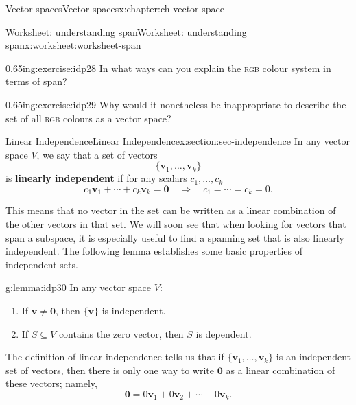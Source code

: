 \documentclass[oneside,10pt,]{book}
\newcommand{\initialism}[1]{\textsc{\MakeLowercase{#1}}}
\newcommand{\terminology}[1]{\textbf{#1}}
\numberwithin{equation}{section}
\newcommand{\vv}{\mathbf{v}}
\begin{document}
\begin{chapterptx}{Vector spaces}{}{Vector spaces}{}{}{x:chapter:ch-vector-space}
\begin{worksheet-section}{Worksheet: understanding span}{}{Worksheet: understanding span}{}{}{x:worksheet:worksheet-span}
\begin{sageinput}
\end{sageinput}
\begin{divisionexercise}{3}{}{0.65in}{g:exercise:idp28}%
In what ways can you explain the \initialism{RGB} colour system in terms of span?%
\end{divisionexercise}%
\begin{divisionexercise}{4}{}{0.65in}{g:exercise:idp29}%
Why would it nonetheless be inappropriate to describe the set of all \initialism{RGB} colours as a vector space?%
\end{divisionexercise}%
\end{worksheet-section}
\restoregeometry
%
%
\typeout{************************************************}
\typeout{************************************************}
%
\begin{sectionptx}{Linear Independence}{}{Linear Independence}{}{}{x:section:sec-independence}
In any vector space \(V\), we say that a set of vectors%
\begin{equation*}
\{\vv_1,\ldots,\vv_k\}
\end{equation*}
is \terminology{linearly independent} if for any scalars \(c_1,\ldots, c_k\)%
\begin{equation*}
c_1\vv_1+\cdots + c_k\vv_k = \mathbf{0} \quad\Rightarrow\quad c_1=\cdots = c_k=0\text{.}
\end{equation*}
%
\par
This means that no vector in the set can be written as a linear combination of the other vectors in that set. We will soon see that when looking for vectors that span a subspace, it is especially useful to find a spanning set that is also linearly independent. The following lemma establishes some basic properties of independent sets.%
\begin{lemma}{}{}{g:lemma:idp30}%
In any vector space \(V\):%
\begin{enumerate}
\item{}If \(\vv\neq\mathbf{0}\), then \(\{\vv\}\) is independent.%
\item{}If \(S\subseteq V\) contains the zero vector, then \(S\) is dependent.%
\end{enumerate}
%
\end{lemma}
The definition of linear independence tells us that if \(\{\vv_1,\ldots, \vv_k\}\) is an independent set of vectors, then there is only one way to write \(\mathbf{0}\) as a linear combination of these vectors; namely,%
\begin{equation*}
\mathbf{0} = 0\vv_1+0\vv_2+\cdots +0\vv_k\text{.}

\end{equation*}
\end{sectionptx}
\end{chapterptx}
\end{document}
